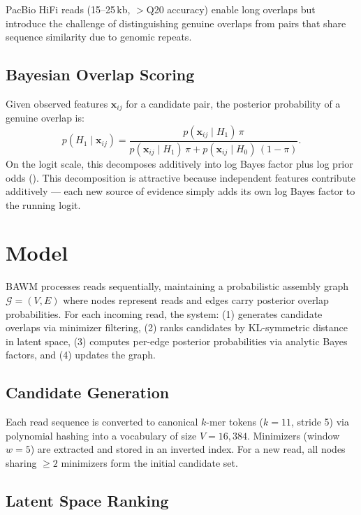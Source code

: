 \documentclass[11pt,a4paper]{article}
\newcommand{\bx}{\mathbf{x}}
\begin{document}
PacBio HiFi reads (15--25\,kb, $>$Q20 accuracy) enable long overlaps
but introduce the challenge of distinguishing genuine overlaps from
pairs that share sequence similarity due to genomic repeats.

\subsection{Bayesian Overlap Scoring}

Given observed features $\bx_{ij}$ for a candidate pair, the posterior
probability of a genuine overlap is:
\begin{equation}
  p(H_1 \mid \bx_{ij})
    = \frac{p(\bx_{ij} \mid H_1)\, \pi}
           {p(\bx_{ij} \mid H_1)\, \pi + p(\bx_{ij} \mid H_0)\,(1-\pi)}.
\end{equation}
On the logit scale, this decomposes additively into log Bayes factor
plus log prior odds ().  This decomposition is
attractive because independent features contribute additively ---
each new source of evidence simply adds its own log Bayes factor to
the running logit.


\section{Model}
\label{sec:model}

BAWM processes reads sequentially, maintaining a probabilistic
assembly graph $\mathcal{G} = (V, E)$ where nodes represent reads and
edges carry posterior overlap probabilities.  For each incoming read,
the system: (1) generates candidate overlaps via minimizer filtering,
(2) ranks candidates by KL-symmetric distance in latent space, (3)
computes per-edge posterior probabilities via analytic Bayes factors,
and (4) updates the graph.

\subsection{Candidate Generation}
\label{sec:candidates}

Each read sequence is converted to canonical $k$-mer tokens
($k=11$, stride 5) via polynomial hashing into a vocabulary of size
$V = 16{,}384$.  Minimizers (window $w=5$) are extracted and stored in
an inverted index.  For a new read, all nodes sharing $\geq 2$
minimizers form the initial candidate set.

\subsection{Latent Space Ranking}
\end{document}
